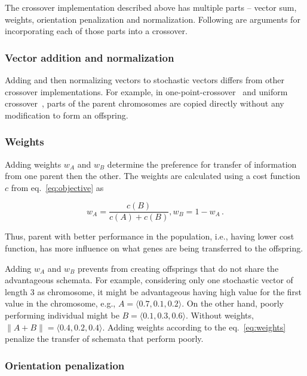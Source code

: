 The crossover implementation described above has multiple parts – vector sum, weights, orientation penalization and normalization.
Following are arguments for incorporating each of those parts into a crossover.

\subsubsection*{Vector addition and normalization}

Adding and then normalizing vectors to stochastic vectors differs from other crossover implementations.
For example, in one-point-crossover~\cite{hollandAdaptationNaturalArtificial1975} and
uniform crossover~\cite{uniformCrossover1989}, parts of the parent chromosomes are copied directly without any modification to form an offspring.



\subsubsection*{Weights}
Adding weights $w_A$ and $w_B$ determine the preference for transfer of information from one parent then the other.
The weights are calculated using a cost function $c$ from eq.~\ref{eq:objective} as

\begin{equation}
    w_A = \dfrac{c(B)}{c(A)+{c(B)}}, w_B = 1 - w_A\,.
    \label{eq:weights}
\end{equation}

Thus, parent with better performance in the population, i.e., having lower cost function,
has more influence on what genes are being transferred to the offspring.

Adding $w_A$ and $w_B$ prevents from creating offsprings that do not share the advantageous schemata.
For example, considering only one stochastic vector of length 3 as chromosome,
it might be advantageous having high value for the first value in the chromosome, e.g., $A=\langle 0.7, 0.1, 0.2 \rangle$.
On the other hand, poorly performing individual might be $B=\langle 0.1, 0.3, 0.6 \rangle$.
Without weights, $\| A+B\| = \langle 0.4, 0.2 , 0.4 \rangle$.
Adding weights according to the eq.~\ref{eq:weights} penalize the transfer of schemata that perform poorly.

\subsubsection*{Orientation penalization}

